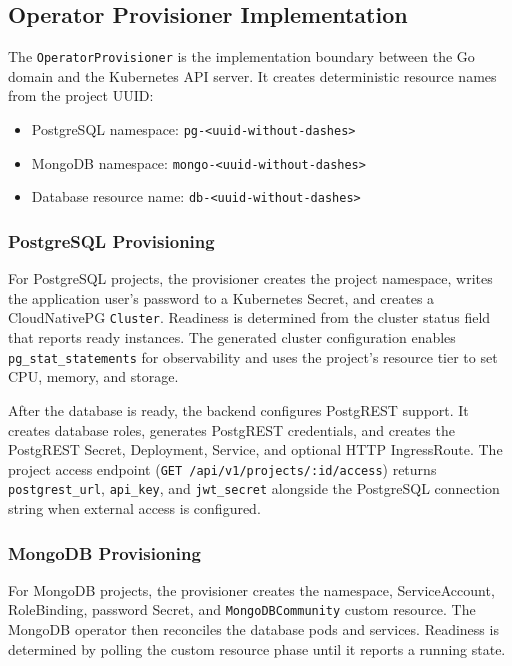 \subsection{Operator Provisioner Implementation}

The \texttt{OperatorProvisioner} is the implementation boundary between the Go domain and the Kubernetes API server. It creates deterministic resource names from the project UUID:

\begin{itemize}
    \item PostgreSQL namespace: \texttt{pg-<uuid-without-dashes>}
    \item MongoDB namespace: \texttt{mongo-<uuid-without-dashes>}
    \item Database resource name: \texttt{db-<uuid-without-dashes>}
\end{itemize}

\subsubsection{PostgreSQL Provisioning}
For PostgreSQL projects, the provisioner creates the project namespace, writes the application user's password to a Kubernetes Secret, and creates a CloudNativePG \texttt{Cluster}. Readiness is determined from the cluster status field that reports ready instances. The generated cluster configuration enables \texttt{pg\_stat\_statements} for observability and uses the project's resource tier to set CPU, memory, and storage.

After the database is ready, the backend configures PostgREST support. It creates database roles, generates PostgREST credentials, and creates the PostgREST Secret, Deployment, Service, and optional HTTP IngressRoute. The project access endpoint (\texttt{GET /api/v1/projects/:id/access}) returns \texttt{postgrest\_url}, \texttt{api\_key}, and \texttt{jwt\_secret} alongside the PostgreSQL connection string when external access is configured.

\subsubsection{MongoDB Provisioning}
For MongoDB projects, the provisioner creates the namespace, ServiceAccount, RoleBinding, password Secret, and \texttt{MongoDBCommunity} custom resource. The MongoDB operator then reconciles the database pods and services. Readiness is determined by polling the custom resource phase until it reports a running state.

